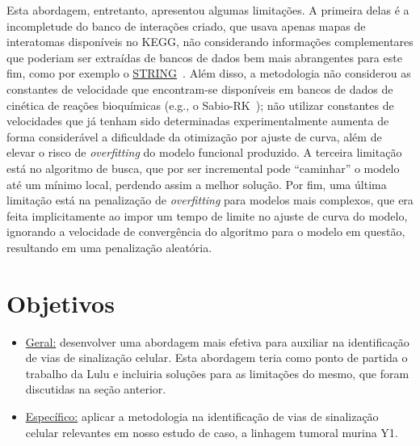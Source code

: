 \documentclass[12pt]{article}
\begin{document}
Esta abordagem, entretanto, apresentou algumas limitações. A primeira delas é a incompletude do banco de interações criado, que usava apenas mapas de interatomas disponíveis no KEGG, não considerando informações complementares que poderiam ser extraídas de bancos de dados bem mais abrangentes para este fim, como por exemplo o \href{https://string-db.org/}{STRING}~\cite{szklarczyk2010string}. Além disso, a metodologia não considerou as constantes de velocidade que encontram-se disponíveis em bancos de dados de cinética de reações bioquímicas (e.g., o Sabio-RK~\cite{doi:10.1093/nar/gkr1046}); não utilizar constantes de velocidades que já tenham sido determinadas experimentalmente aumenta de forma considerável a dificuldade da otimização por ajuste de curva, além de elevar o risco de {\em overfitting} do modelo funcional produzido. A terceira limitação está no algoritmo de busca, que por ser incremental pode ``caminhar'' o modelo até um mínimo local, perdendo assim a melhor solução. Por fim, uma última limitação está na penalização de {\em overfitting} para modelos mais complexos, que era feita implicitamente ao impor um tempo de limite no ajuste de curva do modelo, ignorando a velocidade de convergência do algoritmo para o modelo em questão, resultando em uma penalização aleatória.


\section{Objetivos}

\begin{itemize}

\item \underline{Geral:} desenvolver uma abordagem mais efetiva para auxiliar na identificação de vias de sinalização celular. Esta abordagem teria como ponto de partida o trabalho da Lulu e incluiria soluções para as limitações do mesmo, que foram discutidas na seção anterior.

\item \underline{Específico:} aplicar a metodologia na identificação de vias de sinalização celular relevantes em nosso estudo de caso, a linhagem tumoral murina Y1.

\end{itemize}

\end{document}
